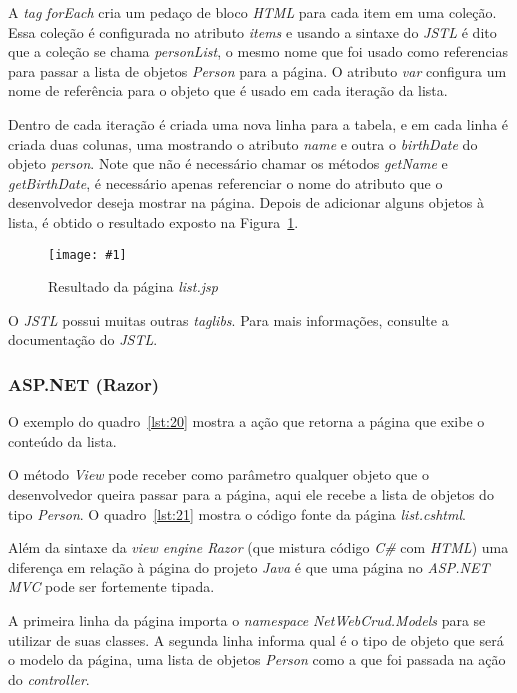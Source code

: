\documentclass[a4paper,12pt]{article}
\newcommand{\figura}[3] {
	\begin{figure}[ht]
		\centering
		\texttt{[image: \#1]}
		\caption{#2}
		\label{#3}
	\end{figure}
	\FloatBarrier
}
\newcommand{\est}[1] {
\textit{#1}}
\newcommand{\classe}[1] {
\textit{#1}}
\newcommand{\arquivo}[1] {
\textit{#1}}
\newcommand{\sigla}[1] {
\textit{#1}}
\newcommand{\lang}[1] {
\textit{#1}}
\newcommand{\pacote}[1] {
\textit{#1}}
\newcommand{\metodo}[1] {
\textit{#1}}
\newcommand{\sharpcode}[3] {
	
}
\begin{document}
A \est{tag} \est{forEach} cria um pedaço de bloco \lang{HTML} para cada item em uma coleção. Essa coleção é configurada no atributo \est{items} e usando a sintaxe do \sigla{JSTL} é dito que a coleção se chama \est{personList}, o mesmo nome que foi usado como referencias para passar a lista de objetos \classe{Person} para a página. O atributo \est{var} configura um nome de referência para o objeto que é usado em cada iteração da lista.

Dentro de cada iteração é criada uma nova linha para a tabela, e em cada linha é criada duas colunas, uma mostrando o atributo \est{name} e outra o \est{birthDate} do objeto \est{person}. Note que não é necessário chamar os métodos \metodo{getName} e \metodo{getBirthDate}, é necessário apenas referenciar o nome do atributo que o desenvolvedor deseja mostrar na página. Depois de adicionar alguns objetos à lista, é obtido o resultado exposto na Figura~\ref{fig:34}.

\figura{34.png}{Resultado da página \arquivo{list.jsp}}{fig:34}

O \sigla{JSTL} possui muitas outras \est{taglibs}. Para mais informações, consulte a documentação do \sigla{JSTL}.

\subsubsection{ASP.NET (Razor)}

O exemplo do quadro~\ref{lst:20} mostra a ação que retorna a página que exibe o conteúdo da lista.

\sharpcode{code/20.txt}{Ação que retorna a página \arquivo{list.cshtml}}{lst:20}

O método \metodo{View} pode receber como parâmetro qualquer objeto que o desenvolvedor queira passar para a página, aqui ele recebe a lista de objetos do tipo \classe{Person}. O quadro~\ref{lst:21} mostra o código fonte da página \arquivo{list.cshtml}.

\sharpcode{code/21.txt}{Código fonte da página \arquivo{list.cshtml}}{lst:21}

Além da sintaxe da \est{view engine Razor} (que mistura código \lang{C\#} com \lang{HTML}) uma diferença em relação à página do projeto \lang{Java} é que uma página no \est{ASP.NET MVC} pode ser fortemente tipada.

A primeira linha da página importa o \est{namespace} \pacote{NetWebCrud.Models} para se utilizar de suas classes. A segunda linha informa qual é o tipo de objeto que será o modelo da página, uma lista de objetos \classe{Person} como a que foi passada na ação do \est{controller}.
\end{document}
